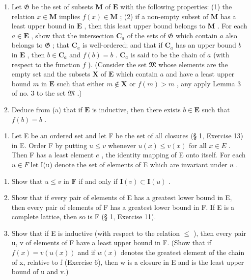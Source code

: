 \begin{enumerate}
\def\labelenumi{(\alph{enumi})}
\item
  Let \(\mathfrak{G}\) be the set of subsets \(\mathbf{M}\) of \(\mathbf{E}\) with the following properties: (1) the relation \(x \in \mathbf{M}\) implies \(f(x) \in \mathbf{M}\) ; (2) if a non-empty subset of \(\mathbf{M}\) has a least upper bound in \(\mathbf{E}\) , then this least upper bound belongs to \(\mathbf{M}\) . For each \(a \in \mathbf{E}\) , show that the intersection \(\mathbf{C}_a\) of the sets of \(\mathfrak{G}\) which contain \(a\) also belongs to \(\mathfrak{G}\) ; that \(\mathbf{C}_a\) is well-ordered; and that if \(\mathbf{C}_a\) has an upper bound \(b\) in \(\mathbf{E}\) , then \(b \in \mathbf{C}_a\) and \(f(b) = b\) . \(\mathbf{C}_a\) is said to be the chain of \(a\) (with respect to the function \(f\) ). (Consider the set \(\mathfrak{M}\) whose elements are the empty set and the subsets \(\mathbf{X}\) of \(\mathbf{E}\) which contain \(a\) and have a least upper bound \(m\) in \(\mathbf{E}\) such that either \(m \notin \mathbf{X}\) or \(f(m) > m\) , any apply Lemma 3 of no. 3 to the set \(\mathfrak{M}\) .)
\item
  Deduce from (a) that if \(\mathbf{E}\) is inductive, then there exists \(b \in \mathbf{E}\) such that \(f(b) = b\) .
\end{enumerate}

\begin{enumerate}
\def\labelenumi{\arabic{enumi}.}
\setcounter{enumi}{6}
\tightlist
\item
  Let E be an ordered set and let F be the set of all closures (§ 1, Exercise 13) in E. Order F by putting \(u \leqslant v\) whenever \(u(x) \leqslant v(x)\) for all \(x \in E\) . Then F has a least element \(e\) , the identity mapping of E onto itself. For each \(u \in F\) let I(u) denote the set of elements of E which are invariant under \(u\) .
\end{enumerate}

\begin{enumerate}
\def\labelenumi{(\alph{enumi})}
\item
  Show that \(u \leqslant v\) in \(\mathbf{F}\) if and only if \(\mathbf{I}(v) \subset \mathbf{I}(u)\) .
\item
  Show that if every pair of elements of E has a greatest lower bound in E, then every pair of elements of F has a greatest lower bound in F. If E is a complete lattice, then so is F (§ 1, Exercise 11).
\item
  Show that if E is inductive (with respect to the relation \(\leqslant\) ), then every pair u, v of elements of F have a least upper bound in F. (Show that if \(f(x) = v(u(x))\) and if \(w(x)\) denotes the greatest element of the chain of x, relative to f (Exercise 6), then w is a closure in E and is the least upper bound of u and v.)
\end{enumerate}

